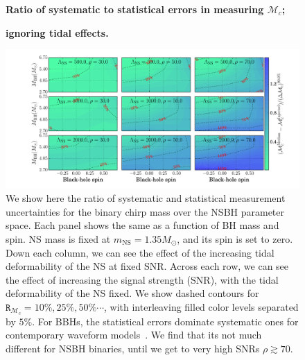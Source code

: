 \documentclass[aps,prd,amsmath,floats,floatfix, twocolumn,
superscriptaddress,nofootinbib,showpacs]{revtex4-1}
\newcommand{\lambdans}{\Lambda_\mathrm{NS}}
\newcommand{\mns}{m_\mathrm{NS}}
\newcommand{\mchirp}{\mathcal{M}_c}
\newcommand{\arr}{\mathtt{R}}
\begin{document}
% 
\begin{figure}
\centering 
\textbf{Ratio of systematic to statistical errors in measuring $\mchirp$;}\par
\textbf{ignoring tidal effects.}\par\medskip
\includegraphics[width=1.95\columnwidth]{plots/TNMchirpBiasesOverCIWidths_CI90_0_Lambda_SNR30_70_linear}
\caption{We show here the ratio of systematic and statistical
measurement uncertainties for the binary chirp mass over the NSBH parameter 
space. Each panel shows the same as a function of BH mass and spin. NS mass
is fixed at $\mns=1.35M_\odot$, and its spin is set to zero. Down each column,
we can see the effect of the increasing tidal deformability of the NS at fixed
SNR. Across each row, we can see the effect of increasing the signal strength
(SNR), with the tidal deformability of the NS fixed. We show dashed contours
for $\arr_{\mchirp}=10\%, 25\%, 50\%\cdots$, with interleaving filled color
levels separated by $5\%$.
% 
For BBHs, the statistical errors dominate systematic ones for contemporary
waveform models~\cite{Inprerp-LVC-WaveModels:2016,Kumar:2016dhh}. We find that
its not much different for NSBH binaries, until we get to very high SNRs
$\rho\gtrsim 70$.
}
\label{fig:TN_chirpMassBias_vs_Lambda_SNR}
\end{figure}
\end{document}
